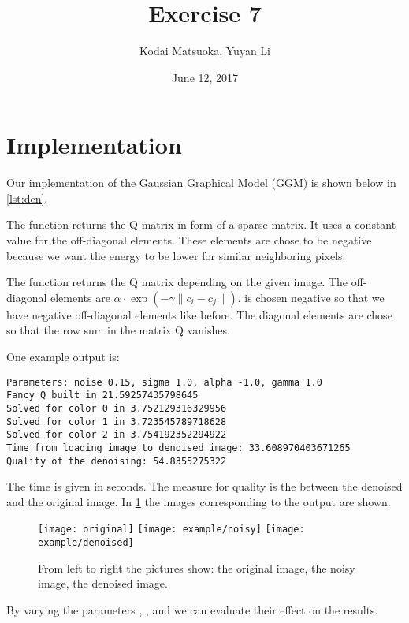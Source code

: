 \documentclass[12pt]{scrartcl}
\author{Kodai Matsuoka, Yuyan Li}
\title{Exercise 7}
\date{June 12, 2017}
\begin{document}
\maketitle

\section{Implementation}

Our implementation of the Gaussian Graphical Model (GGM) is shown below in \cref{lst:den}.

The function  returns the Q matrix in form of a  sparse matrix. It uses a constant value  for the off-diagonal elements. These elements are chose to be negative because we want the energy to be lower for similar neighboring pixels.

The function  returns the Q matrix depending on the given image. The off-diagonal elements are $\alpha \cdot \exp{(- \gamma \lVert c_i - c_j \rVert )}$.  is chosen negative so that we have negative off-diagonal elements like before. The diagonal elements are chose so that the row sum in the matrix Q vanishes.

One example output is:

\begin{verbatim}
Parameters: noise 0.15, sigma 1.0, alpha -1.0, gamma 1.0
Fancy Q built in 21.59257435798645
Solved for color 0 in 3.752129316329956
Solved for color 1 in 3.723545789718628
Solved for color 2 in 3.754192352294922
Time from loading image to denoised image: 33.608970403671265
Quality of the denoising: 54.8355275322
\end{verbatim}

The time is given in seconds. The measure for quality is the  between the denoised and the original image.
In \cref{fig:ex} the images corresponding to the output are shown.

\begin{figure}[h]
  \centering
  \texttt{[image: original]}
  \texttt{[image: example/noisy]}
  \texttt{[image: example/denoised]}
  \caption{From left to right the pictures show: the original image, the noisy image, the denoised image.}
  \label{fig:ex}
\end{figure}

By varying the parameters , ,  and  we can evaluate their effect on the results.
\end{document}
